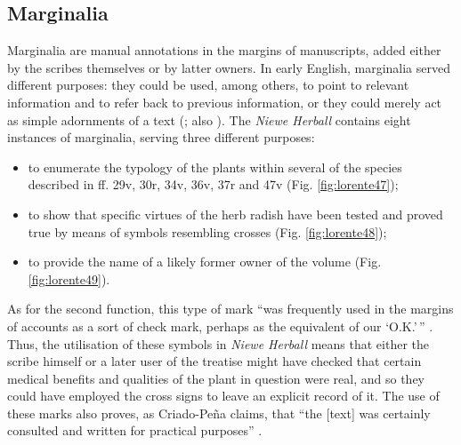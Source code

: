 \begin{paper}
\begin{enumerate}
\end{enumerate}

\subsection{Marginalia}\label{sec:marginalia}

Marginalia are manual annotations in the
margins of manuscripts, added either by the scribes themselves or by latter
owners. In early English, marginalia served different purposes: they could be used, among others, to point to relevant
information and to refer back to previous information, or they could
merely act as simple adornments of a text (\cite[35]{criado_pena_elizabeth_2019}; also
\cite[247]{beal_dictionary_2008}). The \emph{Niewe Herball} contains eight
instances of marginalia, serving three different purposes: 
\begin{itemize}
    \item to enumerate the typology of the plants
within several of the species described in ff. 29v, 30r, 34v, 36v, 37r
and 47v (Fig. \ref{fig:lorente47});
    \item to show that specific virtues of the herb
radish have been tested and proved true by means of symbols resembling
crosses (Fig. \ref{fig:lorente48});
    \item to provide the name of a likely former
owner of the volume (Fig. \ref{fig:lorente49}).
\end{itemize}

As for the second function, this type of mark ``was frequently used in the margins of
accounts as a sort of check mark, perhaps as the equivalent of our
`O.K.'\,'' \citep[134]{tannenbaum_handwriting_1930}. Thus, the utilisation of these symbols in \emph{Niewe
Herball} means that either the scribe himself or a later user of
the treatise might have checked that certain medical benefits and
qualities of the plant in question were real, and so they could have
employed the cross signs to leave an explicit record of it. The use of
these marks also proves, as Criado-Peña claims, that ``the {[}text{]}
was certainly consulted and written for practical purposes'' \citep[35]{criado_pena_elizabeth_2019}.


\end{paper}
